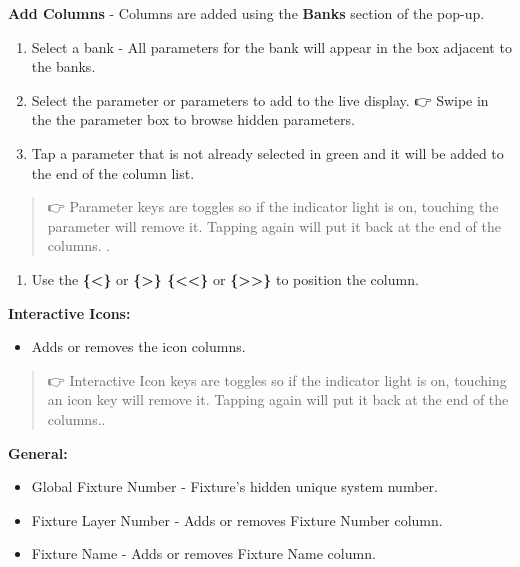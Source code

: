 \documentclass[
]{article}
\providecommand{\tightlist}{%
  \setlength{\itemsep}{0pt}\setlength{\parskip}{0pt}}
\begin{document}
\textbf{Add Columns} - Columns are added using the \textbf{Banks} section of the pop-up.

\begin{enumerate}
\def\labelenumi{\arabic{enumi}.}
\item
  Select a bank - All parameters for the bank will appear in the box adjacent to the banks.
\item
  Select the parameter or parameters to add to the live display. 👉 Swipe in the the parameter box to browse hidden parameters.
\item
  Tap a parameter that is not already selected in green and it will be added to the end of the column list.
\end{enumerate}

\begin{quote}
👉 {Parameter keys are toggles so if the indicator light is on, touching the parameter will remove it. Tapping again will put it back at the end of the columns.
}.
\end{quote}

\begin{enumerate}
\def\labelenumi{\arabic{enumi}.}
\setcounter{enumi}{3}
\tightlist
\item
  Use the \textbf{\{\textbar\textless\}} or \textbf{\{\textgreater\textbar\} \{\textbar\textless\textless\}} or \textbf{\{\textgreater\textgreater\textbar\}} to position the column.
\end{enumerate}

\textbf{Interactive Icons:}

\begin{itemize}
\tightlist
\item
  Adds or removes the icon columns.
\end{itemize}

\begin{quote}
👉 {Interactive Icon keys are toggles so if the indicator light is on, touching an icon key will remove it. Tapping again will put it back at the end of the columns.}.
\end{quote}

\textbf{General:}

\begin{itemize}
\tightlist
\item
  Global Fixture Number - Fixture's hidden unique system number.
\item
  Fixture Layer Number - Adds or removes Fixture Number column.
\item
  Fixture Name - Adds or removes Fixture Name column.
\end{itemize}
\end{document}
